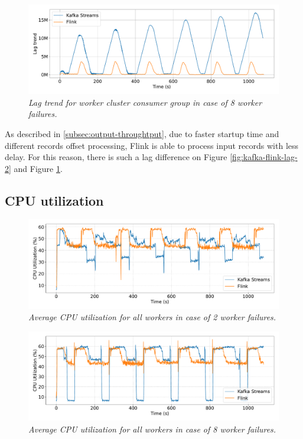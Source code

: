 \begin{figure}[H]
    \centering
    \includegraphics[width=1\textwidth]{figures/kafka-flink/lag-trend-8pod-kafka-flink}
    \caption{\textit{Lag trend for worker cluster consumer group in case of 8 worker failures.}}
    \label{fig:kafka-flink-lag-8}
\end{figure}

As described in \ref{subsec:output-throughtput}, due to faster startup time
and different records offset processing, Flink is able to process
input records with less delay.
For this reason, there is such a lag difference on Figure \ref{fig:kafka-flink-lag-2} and Figure \ref{fig:kafka-flink-lag-8}.

\newpage
\subsection{CPU utilization}\label{subsec:cpu-utilization}

\begin{figure}[H]
    \centering
    \includegraphics[width=1\textwidth]{figures/kafka-flink/cpu-utilization-2pods-kafka-flink}
    \caption{\textit{Average CPU utilization for all workers in case of 2 worker failures.}}
    \label{fig:kafka-flink-cpu-2}
\end{figure}


\begin{figure}[H]
    \centering
    \includegraphics[width=1\textwidth]{figures/kafka-flink/cpu-utilization-8pods-kafka-flink}
    \caption{\textit{Average CPU utilization for all workers in case of 8 worker failures.}}
    \label{fig:kafka-flink-cpu-8}
\end{figure}

